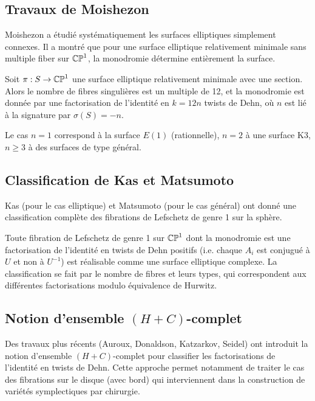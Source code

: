 \subsection{Travaux de Moishezon}

Moishezon a étudié systématiquement les surfaces elliptiques simplement connexes. Il a montré que pour une surface elliptique relativement minimale sans multiple fiber sur $\mathbb{CP}^1$, la monodromie détermine entièrement la surface.

\begin{theoreme}[Moishezon]
Soit $\pi: S \to \mathbb{CP}^1$ une surface elliptique relativement minimale avec une section. Alors le nombre de fibres singulières est un multiple de 12, et la monodromie est donnée par une factorisation de l'identité en $k = 12n$ twists de Dehn, où $n$ est lié à la signature par $\sigma(S) = -n$.
\end{theoreme}

Le cas $n=1$ correspond à la surface $E(1)$ (rationnelle), $n=2$ à une surface K3, $n\ge 3$ à des surfaces de type général.

\subsection{Classification de Kas et Matsumoto}

Kas (pour le cas elliptique) et Matsumoto (pour le cas général) ont donné une classification complète des fibrations de Lefschetz de genre 1 sur la sphère.

\begin{theoreme}
Toute fibration de Lefschetz de genre 1 sur $\mathbb{CP}^1$ dont la monodromie est une factorisation de l'identité en twists de Dehn positifs (i.e. chaque $A_i$ est conjugué à $U$ et non à $U^{-1}$) est réalisable comme une surface elliptique complexe. La classification se fait par le nombre de fibres et leurs types, qui correspondent aux différentes factorisations modulo équivalence de Hurwitz.
\end{theoreme}

\subsection{Notion d'ensemble $(H+C)$-complet}

Des travaux plus récents (Auroux, Donaldson, Katzarkov, Seidel) ont introduit la notion d'ensemble $(H+C)$-complet pour classifier les factorisations de l'identité en twists de Dehn. Cette approche permet notamment de traiter le cas des fibrations sur le disque (avec bord) qui interviennent dans la construction de variétés symplectiques par chirurgie.

